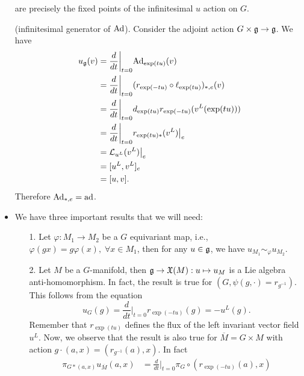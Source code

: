 \begin{itemize}
    are precisely the fixed points of the infinitesimal $u$ action on $G$. 
    \begin{example}
        (infinitesimal generator of $\Ad$). Consider the adjoint action $G\times\fr{g}\to\fr{g}$. We have 
        \begin{equation}
            \begin{split}
                u_{\fr{g}}(v)&=\frac{d}{dt}\bigg|_{t=0}\Ad_{\exp(tu)}(v)\\
                &=\frac{d}{dt}\bigg|_{t=0}(r_{\exp(-tu)}\circ \ell_{\exp(tu)})_{*,e}(v)\\
                &=\frac{d}{dt}\bigg|_{t=0}d_{\exp(tu)}r_{\exp(-tu)}(v^L(\exp(tu)))\\
                &=\frac{d}{dt}\bigg|_{t=0} r_{\exp(tu)*}(v^L)\big|_e\\
                &=\mathcal{L}_{u^L}(v^L)\big|_e\\
                &=[u^L,v^L]_e\\
                &=[u,v].
            \end{split}
        \end{equation}
        Therefore $\Ad_{*,e}=\ad$.
    \end{example}
    \item We have three important results that we will need: 
        \begin{itemize}
            \item[1.] Let $\varphi:M_1\to M_2$ be a $G$ equivariant map, i.e., $\varphi(gx)=g\varphi(x),\;\forall x\in M_1$, then 
            for any $u\in\mathfrak{g}$, we have $u_{M_1}\sim_\varphi u_{M_2}$.
            \item[2.] Let $M$ be a $G$-manifold, then $\mathfrak{g}\to\mathfrak{X}(M):u\mapsto u_M$ is a Lie algebra anti-homomorphism. 
            In fact, the result is true for $(G,\psi(g,\cdot)=r_{g^{-1}})$. This follows from the equation 
            \begin{equation}
                u_G(g)=\frac{d}{dt}\bigg|_{t=0}r_{\exp(-tu)}(g)=-u^L(g).
            \end{equation}
            Remember that $r_{\exp(tu)}$ defines the flux of the left invariant vector field $u^L$. Now, we observe that 
            the result is also true for $\overline{M}=G\times M$ with action $g\cdot(a,x)=(r_{g^{-1}}(a),x)$. In fact 
            \begin{equation}
                \begin{split}
                    \pi_{G*(a,x)}u_{\overline{M}}(a,x)&=\frac{d}{dt}\bigg|_{t=0}\pi_G\circ(r_{\exp(-tu)}(a),x)\\

\end{split}
\end{equation}
\end{itemize}
\end{itemize}
